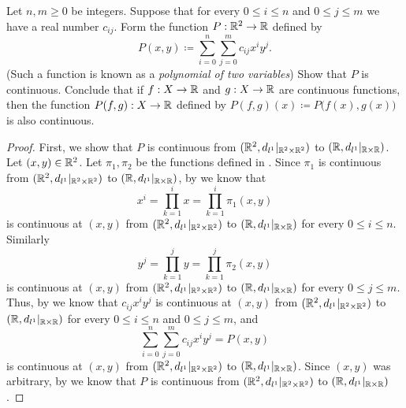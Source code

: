 \begin{ex}\label{ii:ex:2.2.5}
  Let \(n, m \geq 0\) be integers.
  Suppose that for every \(0 \leq i \leq n\) and \(0 \leq j \leq m\) we have a real number \(c_{ij}\).
  Form the function \(P : \mathbb{R}^2 \to \mathbb{R}\) defined by
  \[
    P(x, y) \coloneqq \sum_{i = 0}^n \sum_{j = 0}^m c_{ij} x^i y^j.
  \]
  (Such a function is known as a \emph{polynomial of two variables})
  Show that \(P\) is continuous.
  Conclude that if \(f : X \to \mathbb{R}\) and \(g : X \to \mathbb{R}\) are continuous functions, then the function \(P(f, g) : X \to \mathbb{R}\) defined by \(P(f, g)(x) \coloneqq P\big(f(x), g(x)\big)\) is also continuous.
\end{ex}

\begin{proof}
  First, we show that \(P\) is continuous from \((\mathbb{R}^2, d_{l^1}|_{\mathbb{R}^2 \times \mathbb{R}^2})\) to \((\mathbb{R}, d_{l^1}|_{\mathbb{R} \times \mathbb{R}})\).
  Let \((x, y) \in \mathbb{R}^2\).
  Let \(\pi_1, \pi_2\) be the functions defined in .
  Since \(\pi_1\) is continuous from \((\mathbb{R}^2, d_{l^1}|_{\mathbb{R}^2 \times \mathbb{R}^2})\) to \((\mathbb{R}, d_{l^1}|_{\mathbb{R} \times \mathbb{R}})\), by  we know that
  \[
    x^i = \prod_{k = 1}^i x = \prod_{k = 1}^i \pi_1(x, y)
  \]
  is continuous at \((x, y)\) from \((\mathbb{R}^2, d_{l^1}|_{\mathbb{R}^2 \times \mathbb{R}^2})\) to \((\mathbb{R}, d_{l^1}|_{\mathbb{R} \times \mathbb{R}})\) for every \(0 \leq i \leq n\).
  Similarly
  \[
    y^j = \prod_{k = 1}^j y = \prod_{k = 1}^j \pi_2(x, y)
  \]
  is continuous at \((x, y)\) from \((\mathbb{R}^2, d_{l^1}|_{\mathbb{R}^2 \times \mathbb{R}^2})\) to \((\mathbb{R}, d_{l^1}|_{\mathbb{R} \times \mathbb{R}})\) for every \(0 \leq j \leq m\).
  Thus, by  we know that \(c_{ij} x^i y^j\) is continuous at \((x, y)\) from \((\mathbb{R}^2, d_{l^1}|_{\mathbb{R}^2 \times \mathbb{R}^2})\) to \((\mathbb{R}, d_{l^1}|_{\mathbb{R} \times \mathbb{R}})\) for every \(0 \leq i \leq n\) and \(0 \leq j \leq m\), and
  \[
    \sum_{i = 0}^n \sum_{j = 0}^m c_{ij} x^i y^j = P(x, y)
  \]
  is continuous at \((x, y)\) from \((\mathbb{R}^2, d_{l^1}|_{\mathbb{R}^2 \times \mathbb{R}^2})\) to \((\mathbb{R}, d_{l^1}|_{\mathbb{R} \times \mathbb{R}})\).
  Since \((x, y)\) was arbitrary, by  we know that \(P\) is continuous from \((\mathbb{R}^2, d_{l^1}|_{\mathbb{R}^2 \times \mathbb{R}^2})\) to \((\mathbb{R}, d_{l^1}|_{\mathbb{R} \times \mathbb{R}})\).


\end{proof}
